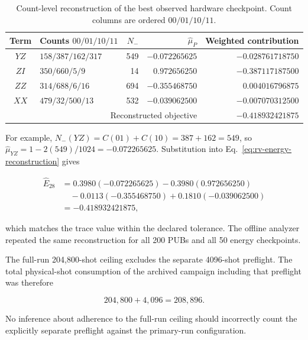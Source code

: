 \begin{table}[t]
  \centering
  \caption{Count-level reconstruction of the best observed hardware checkpoint.  Count columns are ordered $00/01/10/11$.}
  \label{tab:rv-best-checkpoint}
  \renewcommand{\arraystretch}{1.1}
  \begin{tabular}{clrrr}
    \toprule
    Term & Counts $00/01/10/11$ & $N_-$ & $\widehat{\mu}_P$ & Weighted contribution \\
    \midrule
    $YZ$ & $158/387/162/317$ & 549 & $-0.072265625$ & $-0.028761718750$ \\
    $ZI$ & $350/660/5/9$       & 14  & $ 0.972656250$ & $-0.387117187500$ \\
    $ZZ$ & $314/688/6/16$      & 694 & $-0.355468750$ & $ 0.004016796875$ \\
    $XX$ & $479/32/500/13$     & 532 & $-0.039062500$ & $-0.007070312500$ \\
    \midrule
    \multicolumn{4}{r}{Reconstructed objective} & $-0.418932421875$ \\
    \bottomrule
  \end{tabular}
\end{table}

For example, $N_-(YZ)=C(01)+C(10)=387+162=549$, so
$\widehat{\mu}_{YZ}=1-2(549)/1024=-0.072265625$.  Substitution into
Eq.~\eqref{eq:rv-energy-reconstruction} gives

\begin{align}
  \widehat{E}_{28}
  &=0.3980(-0.072265625)-0.3980(0.972656250)\nonumber\\
  &\quad-0.0113(-0.355468750)+0.1810(-0.039062500)\nonumber\\
  &=-0.418932421875,
  \label{eq:rv-best-energy}
\end{align}

which matches the trace value within the declared tolerance.  The offline
analyzer repeated the same reconstruction for all 200 PUBs and all 50 energy
checkpoints.

The full-run 204,800-shot ceiling excludes the separate 4096-shot preflight.
The total physical-shot consumption of the archived campaign including that
preflight was therefore

\begin{equation}
  204{,}800+4{,}096=208{,}896.
  \label{eq:rv-campaign-shots}
\end{equation}

No inference about adherence to the full-run ceiling should incorrectly count
the explicitly separate preflight against the primary-run configuration.

